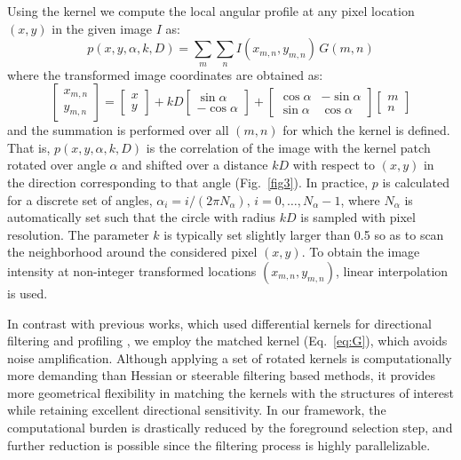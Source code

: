 Using the kernel we compute the local angular profile at any pixel location $(x,y)$ in the given image $I$ as:
\begin{equation}
p(x,y,\alpha,k,D)=\sum_{m}\sum_{n} I(x_{m,n},y_{m,n})\,G(m,n)
\label{eq:angularprofile}
\end{equation}
where the transformed image coordinates are obtained as:
\begin{equation}
\begin{bmatrix} x_{m,n} \\ y_{m,n} \end{bmatrix} =
\begin{bmatrix} x \\ y \end{bmatrix} +
kD\begin{bmatrix} \sin\alpha \\ -\!\cos\alpha \end{bmatrix} +
\begin{bmatrix} \cos\alpha & -\!\sin\alpha \\ \sin\alpha & \cos\alpha \end{bmatrix}
\begin{bmatrix} m \\ n \end{bmatrix}
\label{eq:xymn}
\end{equation}
and the summation is performed over all $(m,n)$ for which the kernel is defined. That is, $p(x,y,\alpha,k,D)$ is the correlation of the image with the kernel patch rotated over angle $\alpha$ and shifted over a distance $kD$ with respect to $(x,y)$ in the direction corresponding to that angle (Fig.~\ref{fig3}). In practice, $p$ is calculated for a discrete set of angles, $\alpha_{i}=i/(2\pi N_{\alpha}),\, i=0,\dots,N_{\alpha}-1$, where $N_{\alpha}$ is automatically set such that the circle with radius $kD$ is sampled with pixel resolution. The parameter $k$ is typically set slightly larger than 0.5 so as to scan the neighborhood around the considered pixel $(x,y)$. To obtain the image intensity at non-integer transformed locations $(x_{m,n},y_{m,n})$, linear interpolation is used.

In contrast with previous works, which used differential kernels for directional filtering and profiling \cite{yu1998rotated, can1999rapid, zhang2007automated}, we employ the matched kernel (Eq.~\ref{eq:G}), which avoids noise amplification. Although applying a set of rotated kernels is computationally more demanding than Hessian or steerable filtering based methods, it provides more geometrical flexibility in matching the kernels with the structures of interest while retaining excellent directional sensitivity. In our framework, the computational burden is drastically reduced by the foreground selection step, and further reduction is possible since the filtering process is highly parallelizable.

